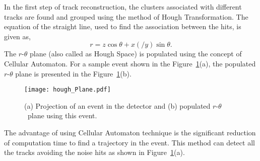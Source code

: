In the first step of track reconstruction, the clusters associated
with different tracks are found and grouped using the method of Hough
Transformation\cite{hought}. The equation of the straight line,
used to find the association between the hits, is given as,
\begin{equation}
  r=z\cos\theta+x\left(/y\right)\sin\theta. \label{eq:hough}
\end{equation}
The \mbox{$r$-$\theta$} plane (also called as Hough Space) is
populated using the concept of Cellular Automaton\cite{cellular}.
For a sample event shown in the Figure~\ref{fig:houghPl}(a),
the populated \mbox{$r$-$\theta$} plane is presented in the
Figure~\ref{fig:houghPl}(b).
\begin{figure}[h]
  \texttt{[image: hough\_Plane.pdf]} 
  \caption{(a) Projection of an event in the detector and
    (b) populated $r$-$\theta$~plane using this event.}
  \label{fig:houghPl}
\end{figure}
The advantage of using Cellular Automaton technique is the significant
reduction of computation time to find a trajectory in the event.
This method can detect all the tracks avoiding the noise hits as
shown in Figure~\ref{fig:houghPl}(a).

